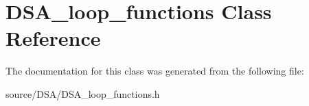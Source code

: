 \hypertarget{class_d_s_a__loop__functions}{}\section{D\+S\+A\+\_\+loop\+\_\+functions Class Reference}
\label{class_d_s_a__loop__functions}


The documentation for this class was generated from the following file\+:\begin{DoxyCompactItemize}
\item 
source/\+D\+S\+A/D\+S\+A\+\_\+loop\+\_\+functions.\+h\end{DoxyCompactItemize}

